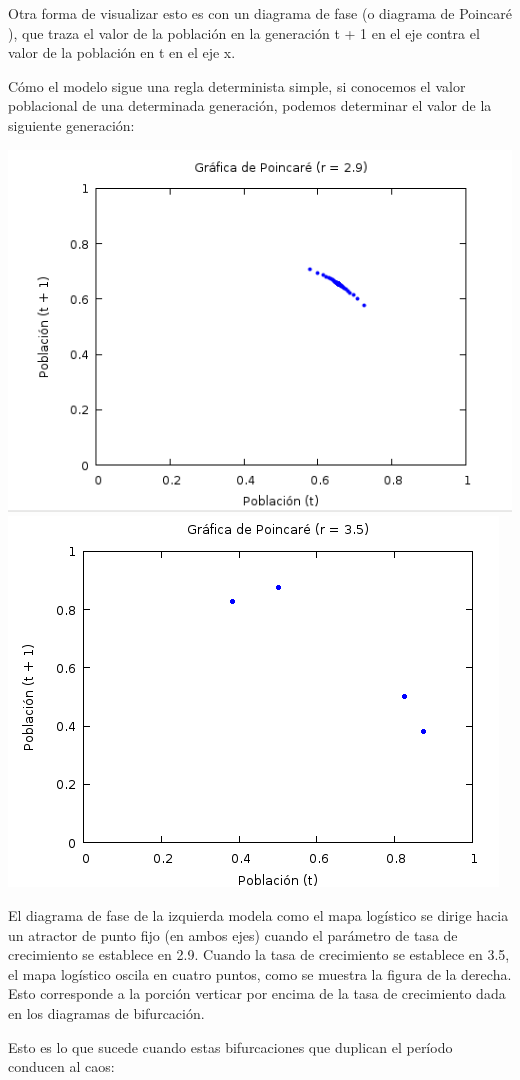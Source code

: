 \documentclass{article}
\begin{document}
Otra forma de visualizar esto es con un diagrama de fase (o diagrama de Poincaré ), que traza el valor de la población en la generación t + 1 en el eje  contra el valor de la población en t en el eje x.

Cómo el modelo sigue una regla determinista simple, si conocemos el valor poblacional de una determinada generación, podemos determinar el valor de la siguiente generación:

\begin{center}
\includegraphics[width=.6\textwidth]{Imagen6.png}
\includegraphics[width=.6\textwidth]{Imagen7.png}
\end{center}

El diagrama de fase de la izquierda modela como el mapa logístico se dirige hacia un atractor de punto fijo (en ambos ejes) cuando el parámetro de tasa de crecimiento se establece en 2.9. Cuando la tasa de crecimiento se establece en 3.5, el mapa logístico oscila en cuatro puntos, como se muestra la figura de la derecha. Esto corresponde a la porción verticar por encima de la tasa de crecimiento dada en los diagramas de bifurcación.

Esto es lo que sucede cuando estas bifurcaciones que duplican el período conducen al caos:
\end{document}
